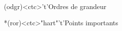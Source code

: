 \documentclass[../../main/main.tex]{subfiles}
\begin{document}
\begin{tcn}[sidebyside, fontupper=\small, fontlower=\small]
	\begin{tcn}(odgr)<ctc>'t'{Ordres de grandeur}
	\end{tcn}
	\begin{tcn}*(ror)<ctc>"hart"'t'{Points importants}
	\end{tcn}
\end{tcn}

\vspace*{\fill}
\vspace{-15pt}
\end{document}
